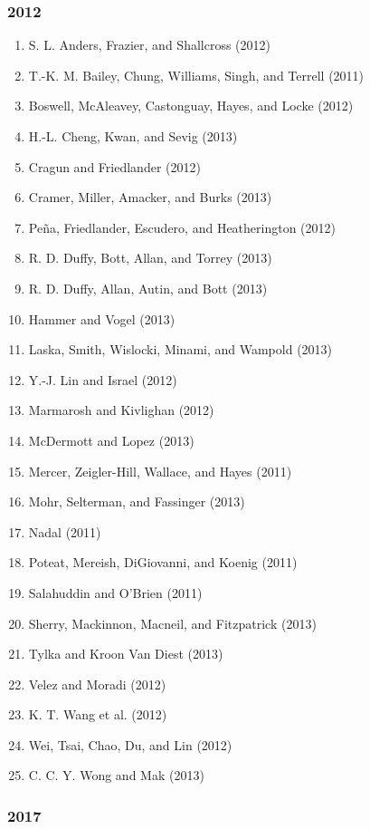 \documentclass[english,man]{apa6}
\providecommand{\tightlist}{%
  \setlength{\itemsep}{0pt}\setlength{\parskip}{0pt}}
\theoremstyle{definition}
\theoremstyle{definition}
\theoremstyle{definition}
\theoremstyle{remark}
\begin{document}
\subsubsection{2012}\label{section-8}

\begin{enumerate}
\def\labelenumi{\arabic{enumi})}
\tightlist
\item
  S. L. Anders, Frazier, and Shallcross (2012)
\item
  T.-K. M. Bailey, Chung, Williams, Singh, and Terrell (2011)
\item
  Boswell, McAleavey, Castonguay, Hayes, and Locke (2012)
\item
  H.-L. Cheng, Kwan, and Sevig (2013)
\item
  Cragun and Friedlander (2012)
\item
  Cramer, Miller, Amacker, and Burks (2013)
\item
  Peña, Friedlander, Escudero, and Heatherington (2012)
\item
  R. D. Duffy, Bott, Allan, and Torrey (2013)
\item
  R. D. Duffy, Allan, Autin, and Bott (2013)
\item
  Hammer and Vogel (2013)
\item
  Laska, Smith, Wislocki, Minami, and Wampold (2013)
\item
  Y.-J. Lin and Israel (2012)
\item
  Marmarosh and Kivlighan (2012)
\item
  McDermott and Lopez (2013)
\item
  Mercer, Zeigler-Hill, Wallace, and Hayes (2011)
\item
  Mohr, Selterman, and Fassinger (2013)
\item
  Nadal (2011)
\item
  Poteat, Mereish, DiGiovanni, and Koenig (2011)
\item
  Salahuddin and O'Brien (2011)
\item
  Sherry, Mackinnon, Macneil, and Fitzpatrick (2013)
\item
  Tylka and Kroon Van Diest (2013)
\item
  Velez and Moradi (2012)
\item
  K. T. Wang et al. (2012)
\item
  Wei, Tsai, Chao, Du, and Lin (2012)
\item
  C. C. Y. Wong and Mak (2013)
\end{enumerate}

\subsubsection{2017}\label{section-9}
\end{document}

